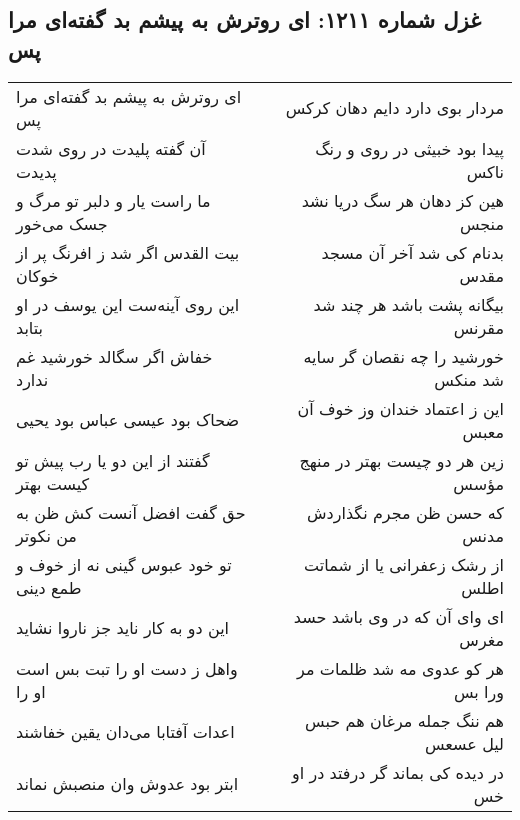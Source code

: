 \begin{center}
\section*{غزل شماره ۱۲۱۱: ای روترش به پیشم بد گفته‌ای مرا پس}
\label{sec:1211}
\begin{longtable}{l p{0.5cm} r}
ای روترش به پیشم بد گفته‌ای مرا پس
&&
مردار بوی دارد دایم دهان کرکس
\\
آن گفته پلیدت در روی شدت پدیدت
&&
پیدا بود خبیثی در روی و رنگ ناکس
\\
ما راست یار و دلبر تو مرگ و جسک می‌خور
&&
هین کز دهان هر سگ دریا نشد منجس
\\
بیت القدس اگر شد ز افرنگ پر از خوکان
&&
بدنام کی شد آخر آن مسجد مقدس
\\
این روی آینه‌ست این یوسف در او بتابد
&&
بیگانه پشت باشد هر چند شد مقرنس
\\
خفاش اگر سگالد خورشید غم ندارد
&&
خورشید را چه نقصان گر سایه شد منکس
\\
ضحاک بود عیسی عباس بود یحیی
&&
این ز اعتماد خندان وز خوف آن معبس
\\
گفتند از این دو یا رب پیش تو کیست بهتر
&&
زین هر دو چیست بهتر در منهج مؤسس
\\
حق گفت افضل آنست کش ظن به من نکوتر
&&
که حسن ظن مجرم نگذاردش مدنس
\\
تو خود عبوس گینی نه از خوف و طمع دینی
&&
از رشک زعفرانی یا از شماتت اطلس
\\
این دو به کار ناید جز ناروا نشاید
&&
ای وای آن که در وی باشد حسد مغرس
\\
واهل ز دست او را تبت بس است او را
&&
هر کو عدوی مه شد ظلمات مر ورا بس
\\
اعدات آفتابا می‌دان یقین خفاشند
&&
هم ننگ جمله مرغان هم حبس لیل عسعس
\\
ابتر بود عدوش وان منصبش نماند
&&
در دیده کی بماند گر درفتد در او خس
\\
\end{longtable}
\end{center}
